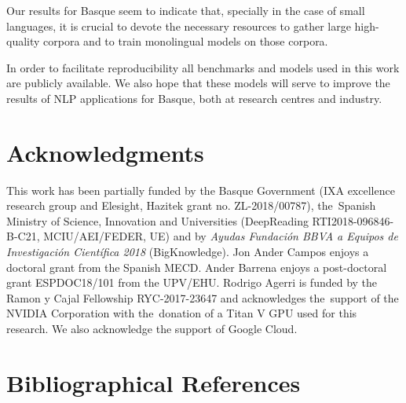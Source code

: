 \documentclass[10pt, a4paper]{article}
\begin{document}
Our results for Basque seem to indicate that, specially in the case of small languages, it is crucial to devote the necessary resources to gather large high-quality corpora and to train monolingual models on those corpora.

In order to facilitate reproducibility all benchmarks and models used in this work are publicly available. We also hope that these models will serve to improve the results of NLP applications for Basque, both at research centres and industry.




\section{Acknowledgments}

This work has been partially funded by the Basque Government (IXA excellence research group and Elesight, Hazitek grant no. ZL-2018/00787), the~Spanish Ministry of Science, Innovation and Universities (DeepReading RTI2018-096846-B-C21, MCIU/AEI/FEDER, UE) and by \textit{Ayudas Fundación BBVA a Equipos de Investigación Científica 2018} (BigKnowledge).  Jon Ander Campos enjoys a doctoral grant from the Spanish MECD. Ander Barrena enjoys a post-doctoral grant ESPDOC18/101 from the UPV/EHU. Rodrigo Agerri is funded by the Ramon y Cajal Fellowship RYC-2017-23647 and acknowledges the~support of the NVIDIA Corporation with the~donation of a Titan V GPU used for this research. We also acknowledge the support of Google Cloud.

\section{Bibliographical References}



\end{document}
